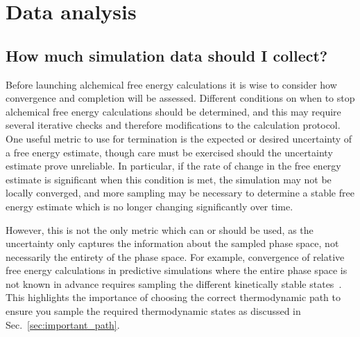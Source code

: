 \section{Data analysis \label{sec:data_analysis}}


\subsection{How much simulation data should I collect?}
\label{sec:how_much_data}
Before launching alchemical free energy calculations it is wise to consider how convergence and completion will be assessed. Different conditions on when to stop alchemical free energy calculations should be determined, and this may require several iterative checks and therefore modifications to the calculation protocol.
One useful metric to use for termination is the expected or desired uncertainty of a free energy estimate, though care must be exercised should the uncertainty estimate prove unreliable.
In particular, if the rate of change in the free energy estimate is significant when this condition is met, the simulation may not be locally converged, and more sampling may be necessary to determine a stable free energy estimate which is no longer changing significantly over time. 

However, this is not the only metric which can or should be used, as the uncertainty only captures the information about the sampled phase space, not necessarily the entirety of the phase space.  
For example, convergence of relative free energy calculations in predictive simulations where the entire phase space is not known in advance requires sampling the different kinetically stable states~\cite{mobley2012perspective}. 
This highlights the importance of choosing the correct thermodynamic path to ensure you sample the required thermodynamic states as discussed in Sec.~\ref{sec:important_path}.

